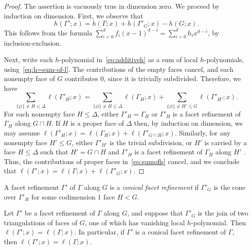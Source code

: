 \documentclass[ALCO,ThmDefs,Unicode,epreuves]{cedram}
\begin{document}
\begin{proof}
The assertion is vacuously true in dimension zero. We proceed by induction on dimension. First, we observe that
\begin{equation}
\label{eq:additiveh} h(\Gamma';x) = h(\Gamma;x) + h(\Gamma'_G;x) - h(G;x).
\end{equation}
This follows from the formula $\sum_{i = 0}^d f_i (x-1)^{d-i} = \sum_{i=0}^d h_i x^{d-i}$, by inclusion-exclusion. 

Next, write each $h$-polynomial in~\eqref{eq:additiveh} as a sum of local $h$-polynomials, using~\eqref{eq:h=sum-of-l}. The contributions of the empty faces cancel, and each nonempty face of $G$ contributes 0, since it is trivially subdivided. Therefore, we have
\begin{equation} \label{eq:sumofls}
\sum_{\{\varnothing\} \neq H \leq \Delta} \ell(\Gamma'_H;x) = \sum_{\{\varnothing\} \neq H \leq \Delta} \ell(\Gamma_H;x) + \sum_{\{\varnothing\} \neq H' \leq G} \ell(\Gamma'_{H'};x).
\end{equation}
For each nonempty face $H \leq \Delta$, either $\Gamma'_H = \Gamma_H$ or $\Gamma'_H$ is a facet refinement of $\Gamma_H$ along $G \cap H$. If $H$ is a proper face of $\Delta$ then, by induction on dimension, we may assume $\ell(\Gamma'_H;x) = \ell(\Gamma_H;x) + \ell(\Gamma'_{G \cap H};x)$. Similarly, for any nonempty face $H' \leq G$, either $\Gamma'_{H'}$ is the trivial subdivision, or $H'$ is carried by a face $H \leq \Delta$ such that $H' = G \cap H$ and $\Gamma'_H$ is a facet refinement of $\Gamma_H$ along $H'$ . Thus, the contributions of proper faces in~\eqref{eq:sumofls} cancel, and we conclude that $\ell(\Gamma';x) = \ell(\Gamma;x) + \ell(\Gamma'_G;x)$.
\end{proof}


\begin{defi}
A facet refinement $\Gamma'$ of $\Gamma$ along $G$ is a \emph{conical facet refinement} if $\Gamma'_G$ is the cone over $\Gamma'_H$ for some codimension 1 face $H < G$.
\end{defi}

\begin{coro} \label{cor:nfacetjoin}
Let $\Gamma'$ be a facet refinement of $\Gamma$ along $G$, and suppose that $\Gamma'_G$ is the join of two triangulations of faces of $G$, one of which has vanishing local $h$-polynomial. Then $\ell(\Gamma';x) = \ell(\Gamma;x)$. In particular, if $\Gamma'$ is a conical facet refinement of $\Gamma$, then $\ell(\Gamma';x) = \ell(\Gamma;x)$. 
\end{coro}
\end{document}
